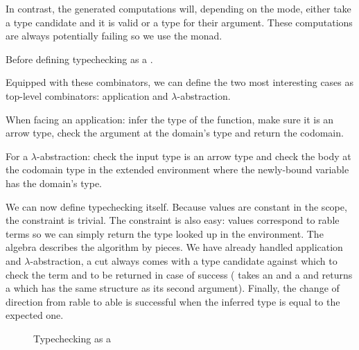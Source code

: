 
In contrast, the generated computations will, depending on the mode, either take a
type candidate and  it is valid or  a type for their argument.
These computations are always potentially failing so we use the  monad.


Before defining typechecking as a .


Equipped with these combinators, we can define the two most interesting cases
as top-level combinators: application and $\lambda$-abstraction.

When facing an application: infer the type of the function, make sure it is an
arrow type, check the argument at the domain's type and return the codomain.


For a $\lambda$-abstraction: check the input type is an arrow type and check
the body at the codomain type in the extended environment where the newly-bound
variable has the domain's type.


We can now define typechecking itself. Because values are constant in the scope,
the  constraint is trivial. The  constraint
is also easy: values correspond to rable terms so we can simply return
the type looked up in the environment. The algebra describes the algorithm by pieces.
We have already handled application and $\lambda$-abstraction, a cut always comes with
a type candidate against which to check the term  and to be returned in case of
success (\AF{\_<\$\_} takes an  and a { } and returns
a { } which has the same structure as its second argument).
Finally, the change of direction from rable to able is successful
when the inferred type is equal to the expected one.

\begin{figure}[h]
\caption{Typechecking as a }
\end{figure}

